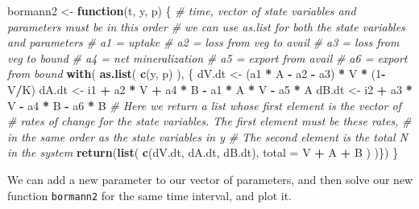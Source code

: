 \documentclass[
]{book}
\newenvironment{Shaded}{\begin{snugshade}}{\end{snugshade}}
\newcommand{\CommentTok}[1]{\textcolor[rgb]{0.56,0.35,0.01}{\textit{#1}}}
\newcommand{\ControlFlowTok}[1]{\textcolor[rgb]{0.13,0.29,0.53}{\textbf{#1}}}
\newcommand{\DataTypeTok}[1]{\textcolor[rgb]{0.13,0.29,0.53}{#1}}
\newcommand{\DecValTok}[1]{\textcolor[rgb]{0.00,0.00,0.81}{#1}}
\newcommand{\KeywordTok}[1]{\textcolor[rgb]{0.13,0.29,0.53}{\textbf{#1}}}
\newcommand{\NormalTok}[1]{#1}
\newcommand{\OperatorTok}[1]{\textcolor[rgb]{0.81,0.36,0.00}{\textbf{#1}}}
\newcommand{\StringTok}[1]{\textcolor[rgb]{0.31,0.60,0.02}{#1}}
\begin{document}
\begin{Shaded}
\begin{Highlighting}[]
\NormalTok{bormann2 <-}\StringTok{ }\ControlFlowTok{function}\NormalTok{(t, y, p) \{}
  \CommentTok{# time, vector of state variables and parameters must be in this order}
  \CommentTok{# we can use as.list for both the state variables and parameters}
  \CommentTok{# a1 = uptake}
  \CommentTok{# a2 = loss from veg to avail}
  \CommentTok{# a3 = loss from veg to bound}
  \CommentTok{# a4 = net mineralization}
  \CommentTok{# a5 = export from avail}
  \CommentTok{# a6 = export from bound}
  \KeywordTok{with}\NormalTok{( }\KeywordTok{as.list}\NormalTok{( }\KeywordTok{c}\NormalTok{(y, p) ), \{}
\NormalTok{    dV.dt <-}\StringTok{ }\NormalTok{(a1 }\OperatorTok{*}\StringTok{ }\NormalTok{A  }\OperatorTok{-}\StringTok{ }\NormalTok{a2  }\OperatorTok{-}\StringTok{ }\NormalTok{a3) }\OperatorTok{*}\StringTok{ }\NormalTok{V }\OperatorTok{*}\StringTok{ }\NormalTok{(}\DecValTok{1}\OperatorTok{-}\NormalTok{V}\OperatorTok{/}\NormalTok{K)}
\NormalTok{    dA.dt <-}\StringTok{ }\NormalTok{i1 }\OperatorTok{+}\StringTok{ }\NormalTok{a2 }\OperatorTok{*}\StringTok{ }\NormalTok{V }\OperatorTok{+}\StringTok{ }\NormalTok{a4 }\OperatorTok{*}\StringTok{ }\NormalTok{B }\OperatorTok{-}\StringTok{ }\NormalTok{a1 }\OperatorTok{*}\StringTok{ }\NormalTok{A }\OperatorTok{*}\StringTok{ }\NormalTok{V }\OperatorTok{-}\StringTok{ }\NormalTok{a5 }\OperatorTok{*}\StringTok{ }\NormalTok{A }
\NormalTok{    dB.dt <-}\StringTok{ }\NormalTok{i2 }\OperatorTok{+}\StringTok{ }\NormalTok{a3 }\OperatorTok{*}\StringTok{ }\NormalTok{V }\OperatorTok{-}\StringTok{ }\NormalTok{a4 }\OperatorTok{*}\StringTok{ }\NormalTok{B }\OperatorTok{-}\StringTok{ }\NormalTok{a6 }\OperatorTok{*}\StringTok{ }\NormalTok{B }
    \CommentTok{# Here we return a list whose first element is the vector of}
    \CommentTok{# rates of change for the state variables. The first element must be these rates,}
    \CommentTok{# in the same order as the state variables in y}
    \CommentTok{# The second element is the total N in the system}
    \KeywordTok{return}\NormalTok{(}\KeywordTok{list}\NormalTok{( }\KeywordTok{c}\NormalTok{(dV.dt, dA.dt, dB.dt), }
                 \DataTypeTok{total =}\NormalTok{ V }\OperatorTok{+}\StringTok{ }\NormalTok{A }\OperatorTok{+}\StringTok{ }\NormalTok{B }
\NormalTok{                 )  )\})}
\NormalTok{\}}
\end{Highlighting}
\end{Shaded}

We can add a new parameter to our vector of parameters, and then solve our new function \texttt{bormann2} for the same time interval, and plot it.
\end{document}
